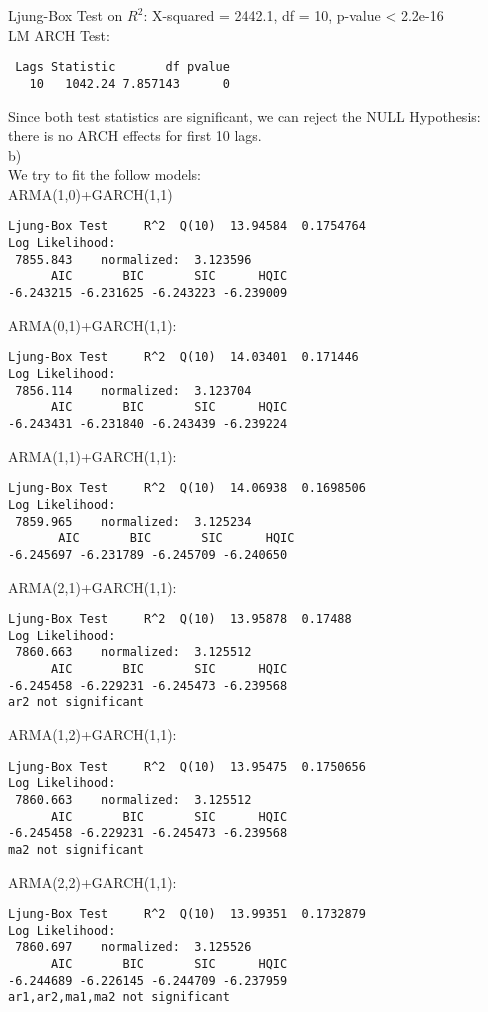 \documentclass[12pt]{article}
\begin{document}
Ljung-Box Test on $R^2$:
X-squared = 2442.1, df = 10, p-value < 2.2e-16\\
LM ARCH Test:
\begin{verbatim}
 Lags Statistic       df pvalue
   10   1042.24 7.857143      0
\end{verbatim}

Since both test statistics are significant, we can reject the NULL Hypothesis: there is no ARCH effects for first 10 lags.\\
\bigskip
b)\\
\bigskip
We try to fit the follow models:\\
ARMA(1,0)+GARCH(1,1)
\begin{verbatim}
Ljung-Box Test     R^2  Q(10)  13.94584  0.1754764 
Log Likelihood:
 7855.843    normalized:  3.123596 
      AIC       BIC       SIC      HQIC 
-6.243215 -6.231625 -6.243223 -6.239009
\end{verbatim}
ARMA(0,1)+GARCH(1,1):
\begin{verbatim}
Ljung-Box Test     R^2  Q(10)  14.03401  0.171446 
Log Likelihood:
 7856.114    normalized:  3.123704 
      AIC       BIC       SIC      HQIC 
-6.243431 -6.231840 -6.243439 -6.239224
\end{verbatim}
ARMA(1,1)+GARCH(1,1):
\begin{verbatim}
Ljung-Box Test     R^2  Q(10)  14.06938  0.1698506
Log Likelihood:
 7859.965    normalized:  3.125234 
       AIC       BIC       SIC      HQIC 
-6.245697 -6.231789 -6.245709 -6.240650 
\end{verbatim}
ARMA(2,1)+GARCH(1,1):
\begin{verbatim}
Ljung-Box Test     R^2  Q(10)  13.95878  0.17488
Log Likelihood:
 7860.663    normalized:  3.125512 
      AIC       BIC       SIC      HQIC 
-6.245458 -6.229231 -6.245473 -6.239568 
ar2 not significant
\end{verbatim}
ARMA(1,2)+GARCH(1,1):
\begin{verbatim}
Ljung-Box Test     R^2  Q(10)  13.95475  0.1750656   
Log Likelihood:
 7860.663    normalized:  3.125512 
      AIC       BIC       SIC      HQIC 
-6.245458 -6.229231 -6.245473 -6.239568 
ma2 not significant 
\end{verbatim}
ARMA(2,2)+GARCH(1,1):
\begin{verbatim}
Ljung-Box Test     R^2  Q(10)  13.99351  0.1732879
Log Likelihood:
 7860.697    normalized:  3.125526 
      AIC       BIC       SIC      HQIC 
-6.244689 -6.226145 -6.244709 -6.237959
ar1,ar2,ma1,ma2 not significant
\end{verbatim}
\end{document}
